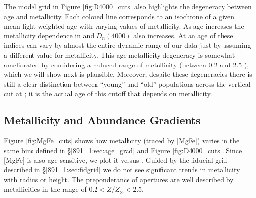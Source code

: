 

The model grid in Figure \ref{fig:D4000_cuts} also highlights the
degeneracy between age and metallicity. Each colored line corresponds
to an isochrone of a given mean light-weighted age with varying values
of metallicity. As age increases the metallicity dependence in \Hda
and $D_n(4000)$ also increases. At an age of  these
indices can vary by almost the entire dynamic range of our data just
by assuming a different value for metallicity.  This age-metallicity
degeneracy is somewhat ameliorated by considering a reduced range of
metallicity (between 0.2 and 2.5 \Zsol), which we will show next is
plausible. Moreover, despite these degeneracies there is still a clear
distinction between ``young'' and ``old'' populations across the
vertical cut at ; it is the actual age of this cutoff
that depends on metallicity.

\subsection{Metallicity and Abundance Gradients}

Figure \ref{fig:MgFe_cuts} shows how metallicity (traced by [MgFe])
varies in the same bins defined in \S\ref{891_1:sec:age_grad} and Figure
\ref{fig:D4000_cuts}. Since [MgFe] is also age sensitive, we plot it
versus \Hda.  Guided by the fiducial grid described in
\S\ref{891_1:sec:fidgrid} we do not see significant trends in metallicity
with radius or height. The preponderance of apertures are well
described by metallicities in the range of $0.2 < Z/Z_\odot < 2.5$.

